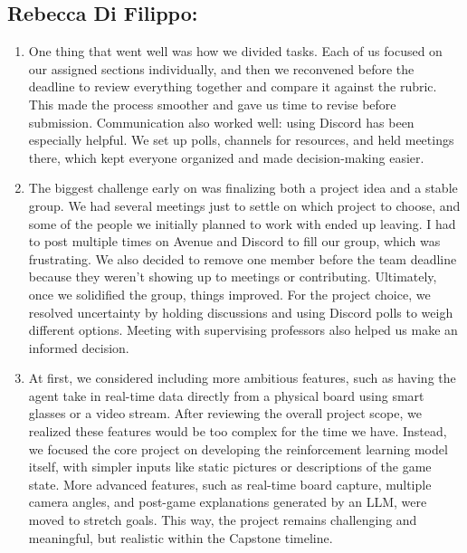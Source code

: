 \documentclass{article}
\begin{document}
\subsection*{Rebecca Di Filippo:}\label{subsec:rebecca-difilippo-reflection}
\begin{enumerate}
    \item
    One thing that went well was how we divided tasks. Each of us focused on our assigned sections individually, and then we reconvened before the deadline to review everything together and compare it against the rubric. This made the process smoother and gave us time to revise before submission. Communication also worked well: using Discord has been especially helpful. We set up polls, channels for resources, and held meetings there, which kept everyone organized and made decision-making easier.
    \item 
    The biggest challenge early on was finalizing both a project idea and a stable group. We had several meetings just to settle on which project to choose, and some of the people we initially planned to work with ended up leaving. I had to post multiple times on Avenue and Discord to fill our group, which was frustrating. We also decided to remove one member before the team deadline because they weren’t showing up to meetings or contributing. Ultimately, once we solidified the group, things improved. For the project choice, we resolved uncertainty by holding discussions and using Discord polls to weigh different options. Meeting with supervising professors also helped us make an informed decision.
    \item
     
    At first, we considered including more ambitious features, such as having the agent take in real-time data directly from a physical board using smart glasses or a video stream. After reviewing the overall project scope, we realized these features would be too complex for the time we have. Instead, we focused the core project on developing the reinforcement learning model itself, with simpler inputs like static pictures or descriptions of the game state. More advanced features, such as real-time board capture, multiple camera angles, and post-game explanations generated by an LLM, were moved to stretch goals. This way, the project remains challenging and meaningful, but realistic within the Capstone timeline.
    
\end{enumerate}
\end{document}

